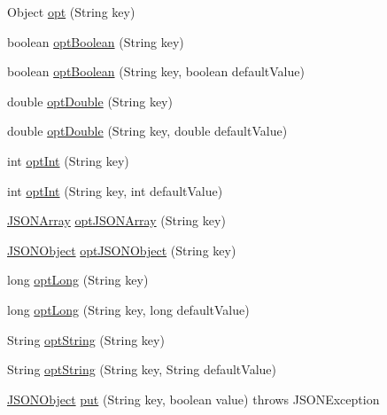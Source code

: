 \begin{DoxyCompactItemize}
\item 
Object \hyperlink{classorg_1_1json_1_1_j_s_o_n_object_a51eeabb3fde00474d3ffd7381ad5d311}{opt} (String key)
\item 
boolean \hyperlink{classorg_1_1json_1_1_j_s_o_n_object_ae2fd84f0e465ade590e47ba7bdce683b}{opt\-Boolean} (String key)
\item 
boolean \hyperlink{classorg_1_1json_1_1_j_s_o_n_object_ae46a66bde2bc443b63ed93cb26677e34}{opt\-Boolean} (String key, boolean default\-Value)
\item 
double \hyperlink{classorg_1_1json_1_1_j_s_o_n_object_a69bf1cb7de87f4b196c0081ddc4c6f58}{opt\-Double} (String key)
\item 
double \hyperlink{classorg_1_1json_1_1_j_s_o_n_object_ab5c3964b0ef382a85927000e743f8281}{opt\-Double} (String key, double default\-Value)
\item 
int \hyperlink{classorg_1_1json_1_1_j_s_o_n_object_abeb2c17bd5a09ab51b25e4b330983a97}{opt\-Int} (String key)
\item 
int \hyperlink{classorg_1_1json_1_1_j_s_o_n_object_a80567fb28cd07b9d5148d7610605305e}{opt\-Int} (String key, int default\-Value)
\item 
\hyperlink{classorg_1_1json_1_1_j_s_o_n_array}{J\-S\-O\-N\-Array} \hyperlink{classorg_1_1json_1_1_j_s_o_n_object_a1e0dce653705a1df438636fbb4fe94e2}{opt\-J\-S\-O\-N\-Array} (String key)
\item 
\hyperlink{classorg_1_1json_1_1_j_s_o_n_object}{J\-S\-O\-N\-Object} \hyperlink{classorg_1_1json_1_1_j_s_o_n_object_aa1024c804613178b09532ef7549e7b2b}{opt\-J\-S\-O\-N\-Object} (String key)
\item 
long \hyperlink{classorg_1_1json_1_1_j_s_o_n_object_af37dbbf760c1833402c986a62c4baef8}{opt\-Long} (String key)
\item 
long \hyperlink{classorg_1_1json_1_1_j_s_o_n_object_aa826ad7537ebfac8adda13f53ee0008b}{opt\-Long} (String key, long default\-Value)
\item 
String \hyperlink{classorg_1_1json_1_1_j_s_o_n_object_afee65e7bb15356d0fa9006ef391449e0}{opt\-String} (String key)
\item 
String \hyperlink{classorg_1_1json_1_1_j_s_o_n_object_a6501a2a9b5a97560d74337c082a32732}{opt\-String} (String key, String default\-Value)
\item 
\hyperlink{classorg_1_1json_1_1_j_s_o_n_object}{J\-S\-O\-N\-Object} \hyperlink{classorg_1_1json_1_1_j_s_o_n_object_a92b8b4edda8b4805abca24f5b689748b}{put} (String key, boolean value)  throws J\-S\-O\-N\-Exception 
\item 

\end{DoxyCompactItemize}
